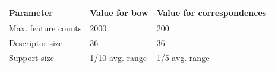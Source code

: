 \begin{table}[H]
    \centering
    \begin{tabular}{@{}lll@{}}
        \toprule
        \textbf{Parameter}  & \textbf{Value for \gls*{bow}} & \textbf{Value for correspondences} \\
        \hline
        Max. feature counts & 2000                          & 200                                \\
        Descriptor size     & 36                            & 36                                 \\
        Support size        & 1/10 avg. range               & 1/5 avg. range                     \\
        \bottomrule
    \end{tabular}
    \caption{\todo{}}
    \label{tab:chap_slam_narf_parameters}
\end{table}

